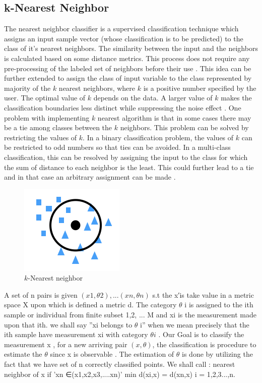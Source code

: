 \subsection{k-Nearest Neighbor}
The nearest neighbor classifier is a supervised classification technique which assigns an input sample vector (whose classification is to be predicted) to the class of it's nearest neighbors. The similarity between the input and the neighbors is calculated based on some distance metrics. This process does not require any pre-processing of the labeled set of neighbors before their use \cite{cover1967}. This idea can be further extended to assign the class of input variable to the class represented by majority of the $k$ nearest neighbors, where $k$ is a positive number specified by the user. The optimal value of $k$ depends on the data. A larger value of $k$ makes the classification boundaries less distinct while suppressing the noise effect \cite{scikit-learn}. One problem with implementing $k$ nearest algorithm is that in some cases there may be a tie among classes between the $k$ neighbors. This problem can be solved by restricting the values of $k$. In a binary classification problem, the values of $k$ can be restricted to odd numbers so that ties can be avoided. In a multi-class classification, this can be resolved by assigning the input to the class for which the sum of distance to each neighbor is the least. This could further lead to a tie and in that case an arbitrary assignment can be made \cite{keller1985}.
\begin{figure}[htb!]
    \centering
    \includegraphics[scale=1]{files/knn.png}
    \caption{$k$-Nearest neighbor}
    \label{k-Nearest neighbor}
    \end{figure}
    \FloatBarrier

\cite{cover1967}
A set of n pairs is given $(x1,\theta 2),...(xn,\theta n)$ s.t the x′is take value in a metric space X upon which is defined a metric d.
The category $\theta$ i is assigned to the ith sample or individual from finite subset {1,2, ... M} and xi is the measurement made upon that ith.
we shall say ”xi belongs to $\theta$ i” when we mean precisely that the ith sample have measurement xi with category $\theta i$ .
Our Goal is to classify the measurement x , for a new arriving pair $(x,\theta )$, the classification is procedure to estimate the $\theta$  since x is observable .
The estimation of $\theta$  is done by utilizing the fact that we have set of n correctly classified points.
We shall call : nearest neighbor of x if
'xn ∈(x1,x2,x3,....xn)'
min d(xi,x) = d(xn,x) i = 1,2,3...,n.

